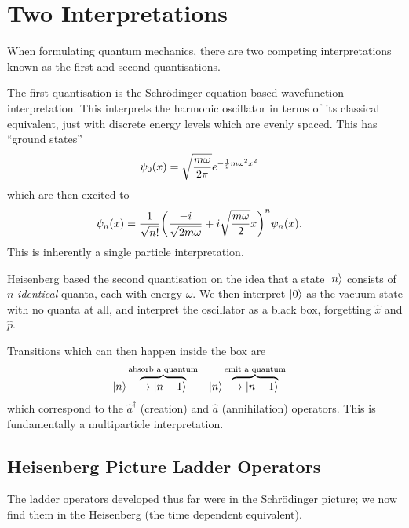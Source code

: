 \documentclass[notes.tex]{subfiles}
\begin{document}
\section{Two Interpretations}
When formulating quantum mechanics, there are two competing interpretations known as the first and second quantisations.

The first quantisation is the Schr\"odinger equation based wavefunction interpretation. This interprets the harmonic oscillator in terms of its classical equivalent, just with discrete energy levels which are evenly spaced. 
This has ``ground states'' 
\begin{align*}
    \psi_0(x) &= \sqrt{\frac{m\omega}{2\pi}} e^{-\frac{1}{2}{}m\omega^2x^2}
\end{align*}
which are then excited to
\begin{align*}
    \psi_n(x) &= \frac{1}{\sqrt{n!}} \qty(\frac{-i}{\sqrt{2m\omega}} + i\sqrt{\frac{m\omega}{2}}x)^n \psi_n(x).
\end{align*}
This is inherently a single particle interpretation.

Heisenberg based the second quantisation on the idea that a state $\ket{n}$ consists of $n$ \emph{identical} quanta, each with energy $\omega$.
We then interpret $\ket{0}$ as the vacuum state with no quanta at all, and interpret the oscillator as a black box, forgetting $\hat{x}$ and $\hat{p}$.

Transitions which can then happen inside the box are 
\begin{align*}
    \ket{n}&\overbrace{\to\ket{n+1}}^{\text{absorb a quantum}}&\ket{n}&\overbrace{\to\ket{n-1}}^\text{emit a quantum}
\end{align*}
which correspond to the $\hat{a}^\dagger$ (creation) and $\hat{a}$ (annihilation) operators. This is fundamentally a multiparticle interpretation.

\subsection{Heisenberg Picture Ladder Operators}
The ladder operators developed thus far were in the Schr\"odinger picture; we now find them in the Heisenberg (\ie the time dependent equivalent). 
\end{document}
